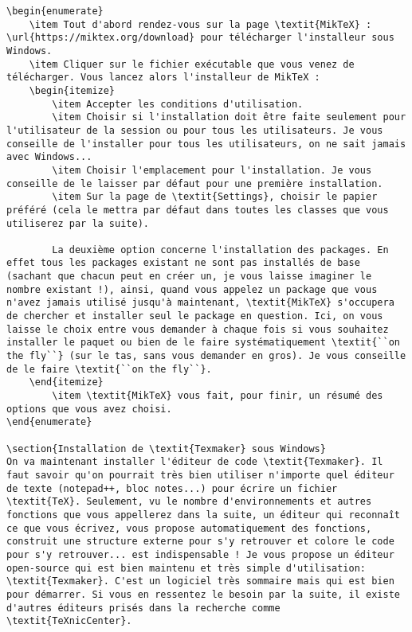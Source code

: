 \documentclass[11pt,a4paper]{article} %
\begin{document}
\begin{Verbatim}[breaklines=true]
\begin{enumerate}
	\item Tout d'abord rendez-vous sur la page \textit{MikTeX} : \url{https://miktex.org/download} pour télécharger l'installeur sous Windows.
	\item Cliquer sur le fichier exécutable que vous venez de télécharger. Vous lancez alors l'installeur de MikTeX :
	\begin{itemize}
		\item Accepter les conditions d'utilisation.
		\item Choisir si l'installation doit être faite seulement pour l'utilisateur de la session ou pour tous les utilisateurs. Je vous conseille de l'installer pour tous les utilisateurs, on ne sait jamais avec Windows...
		\item Choisir l'emplacement pour l'installation. Je vous conseille de le laisser par défaut pour une première installation.
		\item Sur la page de \textit{Settings}, choisir le papier préféré (cela le mettra par défaut dans toutes les classes que vous utiliserez par la suite).

		La deuxième option concerne l'installation des packages. En effet tous les packages existant ne sont pas installés de base (sachant que chacun peut en créer un, je vous laisse imaginer le nombre existant !), ainsi, quand vous appelez un package que vous n'avez jamais utilisé jusqu'à maintenant, \textit{MikTeX} s'occupera de chercher et installer seul le package en question. Ici, on vous laisse le choix entre vous demander à chaque fois si vous souhaitez installer le paquet ou bien de le faire systématiquement \textit{``on the fly``} (sur le tas, sans vous demander en gros). Je vous conseille de le faire \textit{``on the fly``}.
	\end{itemize}
		\item \textit{MikTeX} vous fait, pour finir, un résumé des options que vous avez choisi.
\end{enumerate}

\section{Installation de \textit{Texmaker} sous Windows}
On va maintenant installer l'éditeur de code \textit{Texmaker}. Il faut savoir qu'on pourrait très bien utiliser n'importe quel éditeur de texte (notepad++, bloc notes...) pour écrire un fichier \textit{TeX}. Seulement, vu le nombre d'environnements et autres fonctions que vous appellerez dans la suite, un éditeur qui reconnaît ce que vous écrivez, vous propose automatiquement des fonctions, construit une structure externe pour s'y retrouver et colore le code pour s'y retrouver... est indispensable ! Je vous propose un éditeur open-source qui est bien maintenu et très simple d'utilisation: \textit{Texmaker}. C'est un logiciel très sommaire mais qui est bien pour démarrer. Si vous en ressentez le besoin par la suite, il existe d'autres éditeurs prisés dans la recherche comme \textit{TeXnicCenter}.


\end{Verbatim}
\end{document}
